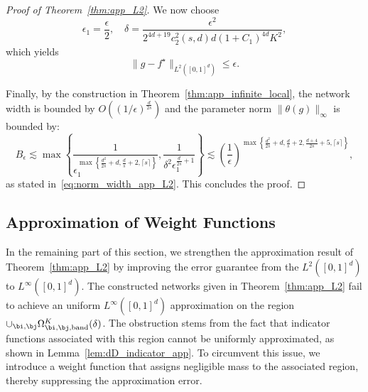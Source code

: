 \documentclass[11pt]{article}
\begin{document}
\begin{proof}[Proof of Theorem~\ref{thm:app_L2}]
    
    We now choose
     \begin{equation*}
         \epsilon_1 = \frac{\epsilon}{2}, \quad \delta = \frac{\epsilon^2}{2^{4d+19} c_2^2(s,d) d (1 + C_1)^{4d}K^2},
     \end{equation*}
     which yields
     \begin{equation*}
         \|g - f^{\star}\|_{L^2([0,1]^d)} \leq \epsilon.
     \end{equation*}
     
     
     Finally, by the construction in Theorem~\ref{thm:app_infinite_local}, the network width is bounded by $O((1/ \epsilon)^{\frac{d}{2s}})$ and the parameter norm $\|\theta(g)\|_{\infty}$ is bounded by:
     \begin{equation*}
         B_{\epsilon} \lesssim \max \left\{ \frac{1}{\epsilon_1^{\max \left\{ \frac{d^2}{2s}+d, \frac{d}{s}+2, \lceil s\rceil \right\} }} ,\frac{1}{\delta^2 \epsilon_1^{\frac{d}{2s}+1}}\right\} \lesssim \left( \frac{1}{\epsilon}\right)^{\max \left\{\frac{d^2}{2s}+d, \frac{d}{s}+2, \frac{d+4}{2s}+5, \lceil s \rceil\right\}},
     \end{equation*}
    as stated in~\eqref{eq:norm_width_app_L2}. This concludes the proof.
\end{proof}

\subsection{Approximation of Weight Functions}
In the remaining part of this section, we strengthen the approximation result of Theorem~\ref{thm:app_L2} by improving the error guarantee from the $L^2([0,1]^d)$ to $L^{\infty}([0,1]^d)$. The constructed networks given in  Theorem~\ref{thm:app_L2} fail to achieve an uniform $L^{\infty}([0,1]^d)$ approximation on the region $\cup_{\bi, \bj} \Omega_{\bi, \bj, \mathrm{band}}^K(\delta)$. The obstruction stems from the fact that indicator functions associated with this region cannot be uniformly approximated, as shown in Lemma~\ref{lem:dD_indicator_app}. To circumvent this issue, we introduce a weight function that assigns negligible mass to the associated region, thereby suppressing the approximation error.
\end{document}
